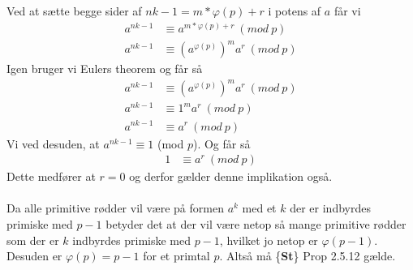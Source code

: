 \documentclass[12pt]{article}
\begin{document}
Ved at sætte begge sider af $nk-1=m*\varphi(p)+r$ i potens af $a$ får vi
\begin{align*}
a^{nk-1}&\equiv a^{m*\varphi(p)+r} \:(mod\:p) \\
a^{nk-1}&\equiv (a^{\varphi(p)})^ma^r  \:(mod\:p)
\end{align*}
Igen bruger vi Eulers theorem og får så
\begin{align*}
a^{nk-1}&\equiv (a^{\varphi(p)})^ma^r \:(mod\:p) \\
a^{nk-1}&\equiv 1^ma^r \:(mod\:p) \\
a^{nk-1}&\equiv a^r \:(mod\:p)
\end{align*}
Vi ved desuden, at $a^{nk-1}\equiv 1$ (mod $p$). Og får så
\begin{align*}
1&\equiv a^r \:(mod\:p)
\end{align*}
Dette medfører at $r=0$ og derfor gælder denne implikation også.\\
\\
Da alle primitive rødder vil være på formen $a^k$ med et $k$ der er indbyrdes primiske med $p-1$ betyder det at der vil være netop så mange primitive rødder som der er $k$ indbyrdes primiske med $p-1$, hvilket jo netop er $\varphi(p-1)$. Desuden er $\varphi(p)=p-1$ for et primtal $p$. Altså må \{\textbf{St}\} Prop 2.5.12 gælde.
\end{document}

